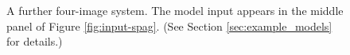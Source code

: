 \documentclass[12pt,preprint]{aastex}
\begin{document}
\begin{figure}
{  }

  \caption[result 7022 (ASW0000h2m)]{A further four-image system. The
    model input appears in the middle panel of Figure
    \ref{fig:input-spag}. (See Section \ref{sec:example_models} for
    details.)}
  \label{fig:7022}
\end{figure}
  
\end{document}
